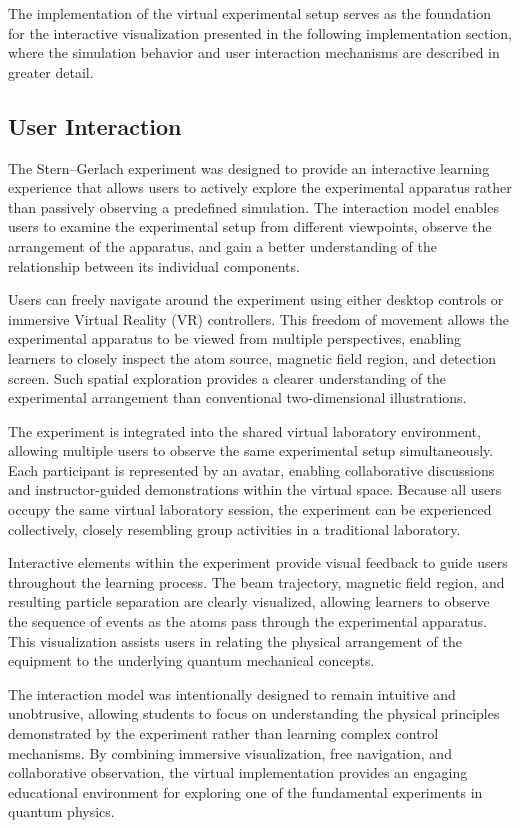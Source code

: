 The implementation of the virtual experimental setup serves as the foundation for the interactive visualization presented in the following implementation section, where the simulation behavior and user interaction mechanisms are described in greater detail.

\subsection{User Interaction}

The Stern--Gerlach experiment was designed to provide an interactive learning experience that allows users to actively explore the experimental apparatus rather than passively observing a predefined simulation. The interaction model enables users to examine the experimental setup from different viewpoints, observe the arrangement of the apparatus, and gain a better understanding of the relationship between its individual components.

Users can freely navigate around the experiment using either desktop controls or immersive Virtual Reality (VR) controllers. This freedom of movement allows the experimental apparatus to be viewed from multiple perspectives, enabling learners to closely inspect the atom source, magnetic field region, and detection screen. Such spatial exploration provides a clearer understanding of the experimental arrangement than conventional two-dimensional illustrations.

The experiment is integrated into the shared virtual laboratory environment, allowing multiple users to observe the same experimental setup simultaneously. Each participant is represented by an avatar, enabling collaborative discussions and instructor-guided demonstrations within the virtual space. Because all users occupy the same virtual laboratory session, the experiment can be experienced collectively, closely resembling group activities in a traditional laboratory.

Interactive elements within the experiment provide visual feedback to guide users throughout the learning process. The beam trajectory, magnetic field region, and resulting particle separation are clearly visualized, allowing learners to observe the sequence of events as the atoms pass through the experimental apparatus. This visualization assists users in relating the physical arrangement of the equipment to the underlying quantum mechanical concepts.

The interaction model was intentionally designed to remain intuitive and unobtrusive, allowing students to focus on understanding the physical principles demonstrated by the experiment rather than learning complex control mechanisms. By combining immersive visualization, free navigation, and collaborative observation, the virtual implementation provides an engaging educational environment for exploring one of the fundamental experiments in quantum physics.

